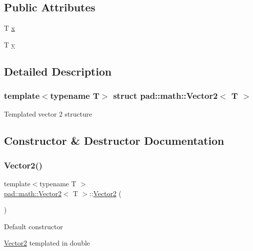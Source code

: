 \subsection*{Public Attributes}
\begin{DoxyCompactItemize}
\item 
T \mbox{\hyperlink{structpad_1_1math_1_1_vector2_a3d4fc9deec4a8fd923ea4f5f73dfb763}{x}}
\item 
T \mbox{\hyperlink{structpad_1_1math_1_1_vector2_a481eca28456d2e02f635059d379b89f5}{y}}
\end{DoxyCompactItemize}


\subsection{Detailed Description}
\subsubsection*{template$<$typename T$>$\newline
struct pad\+::math\+::\+Vector2$<$ T $>$}

Templated vector 2 structure 

\subsection{Constructor \& Destructor Documentation}
\mbox{\label{structpad_1_1math_1_1_vector2_afaa3496649b893db8720d87c9dc4f03f}} 
\subsubsection{\texorpdfstring{Vector2()}{Vector2()}\hspace{0.1cm}{\footnotesize\ttfamily [1/4]}}
{\footnotesize\ttfamily template$<$typename T $>$ \\
\mbox{\hyperlink{structpad_1_1math_1_1_vector2}{pad\+::math\+::\+Vector2}}$<$ T $>$\+::\mbox{\hyperlink{structpad_1_1math_1_1_vector2}{Vector2}} (\begin{DoxyParamCaption}{ }\end{DoxyParamCaption})}

Default constructor

\mbox{\hyperlink{structpad_1_1math_1_1_vector2}{Vector2}} templated in double \mbox{\label{structpad_1_1math_1_1_vector2_ab21c64ccea2b5c873a9edf99c452e5a8}} 
